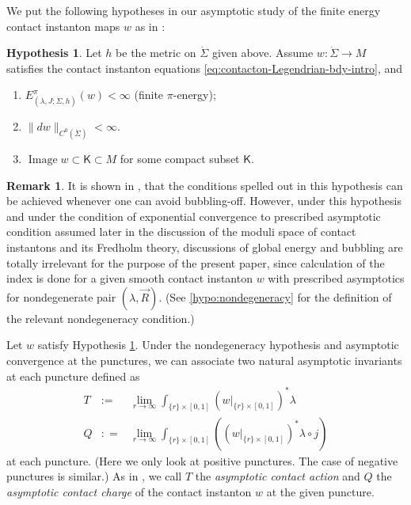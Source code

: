 \documentclass[reqno]{amsart}
\newcommand{\bea}{\begin{eqnarray}}
\newcommand{\eea}{\end{eqnarray}}
\theoremstyle{theorem}
\theoremstyle{definition}
\newtheorem{rem}[thm]{Remark}
\newtheorem{hypo}[thm]{Hypothesis}
\numberwithin{equation}{section}
\def\Image{\operatorname{Image}}
\begin{document}
We put the following hypotheses in our asymptotic study of the finite
energy contact instanton maps $w$ as in \cite{oh-wang:CR-map1}:
\begin{hypo}\label{hypo:basic-intro}
Let $h$ be the metric on $\dot \Sigma$ given above.
Assume $w:\dot\Sigma\to M$ satisfies the contact instanton equations \eqref{eq:contacton-Legendrian-bdy-intro},
and
\begin{enumerate}
\item $E^\pi_{(\lambda,J;\dot\Sigma,h)}(w)<\infty$ (finite $\pi$-energy);
\item $\|d w\|_{C^0(\dot\Sigma)} <\infty$.
\item $\Image w \subset \mathsf K\subset M$ for some compact subset $\mathsf K$.
\end{enumerate}
\end{hypo}

\begin{rem}
It is shown in \cite{oh:contacton}, \cite{oh:entanglement1} that the conditions
spelled out in this hypothesis can be achieved whenever one can avoid bubbling-off. However,
under this hypothesis and under the condition of exponential convergence to prescribed
asymptotic condition assumed later in the discussion of the moduli space of contact
instantons and its Fredholm theory, discussions of global energy and bubbling are
totally irrelevant for the purpose of the present paper, since calculation of the index is
done for a given smooth contact instanton $w$ with prescribed asymptotics for nondegenerate
pair $(\lambda, \vec R)$. (See \eqref{hypo:nondegeneracy} for the definition of the relevant
nondegeneracy condition.)
\end{rem}

Let $w$ satisfy Hypothesis \ref{hypo:basic-intro}. Under the nondegeneracy hypothesis
and asymptotic convergence at the punctures, we can associate two
natural asymptotic invariants at each puncture defined as
\bea
T & := & \lim_{r \to \infty} \int_{\{r\}\times [0,1]}(w|_{\{r\}\times [0,1] })^*\lambda
\label{eq:TQ-T-intro}\\
Q & : = & \lim_{r \to \infty} \int_{\{r\}\times [0,1]}((w|_{\{r\}\times [0,1] })^*\lambda\circ j)\label{eq:TQ-Q-intro}
\eea
at each puncture.
(Here we only look at positive punctures. The case of negative punctures is similar.)
As in \cite{oh-wang:CR-map1}, we call $T$ the \emph{asymptotic contact action}
and $Q$ the \emph{asymptotic contact charge} of the contact instanton $w$ at the given puncture.
\end{document}
